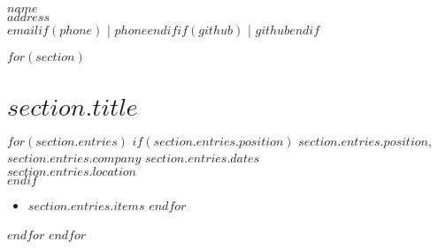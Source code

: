 \documentclass[11pt]{article}
\begin{document}
{\LARGE \textbf{$name$}}\\
$address$\\
\href{mailto:$email$}{$email$}$if(phone)$ | $phone$$endif$$if(github)$ | \href{https://github.com/$github$}{$github$}$endif$

\vspace{1em}

$for(section)$
\section*{$section.title$}
$for(section.entries)$
$if(section.entries.position)$
\textbf{$section.entries.position$}, $section.entries.company$ \hfill \emph{$section.entries.dates$}\\
$section.entries.location$\\
$endif$
\begin{itemize}
$for(section.entries.items)$
  \item $section.entries.items$
$endfor$
\end{itemize}
$endfor$
$endfor$
\end{document}
